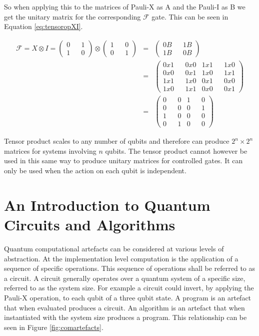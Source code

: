 So when applying this to the matrices of Pauli-X as A and the Pauli-I as B we get the unitary matrix for the corresponding $\mathcal{F}$ gate.
This can be seen in Equation \ref{eq:tensoropXI}.

\begin{eqnarray}
  \mathcal{F} =
X \otimes I =
\begin{pmatrix}
0 && 1\\
1 && 0
\end{pmatrix}
\otimes
\begin{pmatrix}
1 && 0 \\
0 && 1
\end{pmatrix} & = & \begin{pmatrix}
0B && 1B \\
1B && 0B
\end{pmatrix}  \nonumber \\
   & = & \begin{pmatrix}
0x1 && 0x0 & 1x1 && 1x0\\
0x0 && 0x1 & 1x0 && 1x1\\
1x1 && 1x0 & 0x1 && 0x0\\
1x0 && 1x1 & 0x0 && 0x1
\end{pmatrix} \nonumber  \\
   & = & \begin{pmatrix}
0 && 0 & 1 && 0\\
0 && 0 & 0 && 1\\
1 && 0 & 0 && 0\\
0 && 1 & 0 && 0
\end{pmatrix}
\label{eq:tensoropXI}
\end{eqnarray}

Tensor product scales to any number of qubits and therefore can produce $2^n\times{2^n}$ matrices for systems involving $n$ qubits.
The tensor product cannot however be used in this same way to produce unitary matrices for controlled gates.
It can only be used when the action on each qubit is independent.

\section{An Introduction to Quantum Circuits and Algorithms}

Quantum computational artefacts can be considered at various levels of abstraction.
At the implementation level computation is the application of a sequence of specific operations.
This sequence of operations shall be referred to as a circuit.
A circuit generally operates over a quantum system of a specific size, referred to as the system size.
For example a circuit could invert, by applying the Pauli-X operation, to each qubit of a three qubit state.
A program is an artefact that when evaluated produces a circuit.
An algorithm is an artefact that when instantiated with the system size produces a program.
This relationship can be seen in Figure \ref{fig:comartefacts}.

